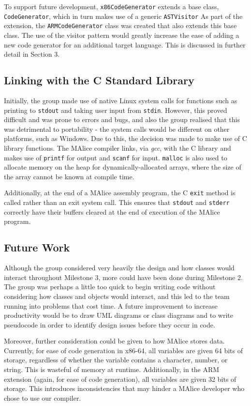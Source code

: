 \documentclass[a4wide, 11pt]{article}
\begin{document}
To support future development, \texttt{x86CodeGenerator} extends a base class,
\texttt{CodeGenerator}, which in turn makes use of a generic \texttt{ASTVisitor}
As part of the extension, the \texttt{ARMCodeGenerator} class was
created that also extends this base class. The use of the visitor pattern
would greatly increase the ease of adding a new code generator for an additional
target language. This is discussed in further detail in Section 3.

\subsection{Linking with the C Standard Library}
Initially, the group made use of native Linux system calls for functions such
as printing to \texttt{stdout} and taking user input from \texttt{stdin}. 
However, this proved difficult and was prone to errors and bugs, and also
the group realised that this was detrimental to portability - the system calls
would be different on other platforms, such as Windows. Due to this, the 
decision was made to make use of C library functions. The MAlice compiler links,
via \emph{gcc}, with the C library and makes use of \texttt{printf} for output
and \texttt{scanf} for input. \texttt{malloc} is also used to allocate memory
on the heap for dynamically-allocated arrays, where the size of the array
cannot be known at compile time. 

Additionally, at the end of a MAlice assembly program, the C \texttt{exit} 
method is called rather than an exit system call. This ensures that 
\texttt{stdout} and \texttt{stderr} correctly have their buffers cleared at the
end of execution of the MAlice program.

\subsection{Future Work}

Although the group considered very heavily the design and how classes would
interact throughout Milestone 3, more could have been done during Milestone 2.
The group was perhaps a little too quick to begin writing code without 
considering how classes and objects would interact, and this led to the team 
running into problems that cost time. A future improvement to increase 
productivity would be to draw UML diagrams or class diagrams and to write
pseudocode in order to identify design issues before they occur in code.

Moreover, further consideration could be given to how MAlice stores data. 
Currently, for ease of code generation in x86-64, all variables are given
64 bits of storage, regardless of whether the variable contains a character,
number, or string. This is wasteful of memory at runtime. Additionally, in the
ARM extension (again, for ease of code generation), all variables are given
32 bits of storage. This introduces inconsistencies that may hinder a MAlice
developer who chose to use our compiler.
\end{document}
